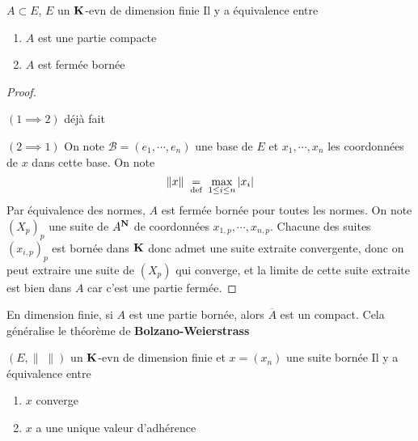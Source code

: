 \begin{thm}
    \Hyp $A\subset E$,  $E$ un  $\mathbf K$-evn de dimension finie
    \Conc Il y a équivalence entre \begin{enumerate}
        \item $A$ est une partie compacte
        \item  $A$ est fermée bornée
    \end{enumerate}
\end{thm}

\begin{proof}
~

$(1\implies 2)$ déjà fait

$(2 \implies  1)$ On note $\mathcal  B=(e_1,\cdots ,e_n)$ une base de $E$ et  $x_1,\cdots ,x_n$ les coordonnées de $x$ dans cette base. On note \[
    \|x\|\;\underset{\text{def}}=\; \max_{1\leq i\leq n} |x_i|
\] 
Par équivalence des normes, $A$ est fermée bornée pour toutes les normes. On note $(X_p)_p$ une suite de  $A^{\mathbf N}$ de coordonnées $x_{1,p},\cdots ,x_{n,p}$. Chacune des suites $(x_{i,p})_p$ est bornée dans $\mathbf K$ donc admet une suite extraite convergente, donc on peut extraire une suite de $(X_p)$ qui converge, et la limite de cette suite extraite est bien dans  $A$ car c'est une partie fermée.
\end{proof}

\begin{rem}
    En dimension finie, si $A$ est une partie bornée, alors  $\overline{A} $ est un compact. Cela généralise le théorème de \textbf{Bolzano-Weierstrass}
\end{rem}



\begin{prop}
    \Hyp $(E, \|\;\|)$ un $\mathbf K$-evn de dimension finie et $x=(x_n)$ une suite bornée
    \Conc Il y a équivalence entre \begin{enumerate}
        \item $x$ converge
        \item  $x$ a une unique valeur d'adhérence
    \end{enumerate}
\end{prop}

